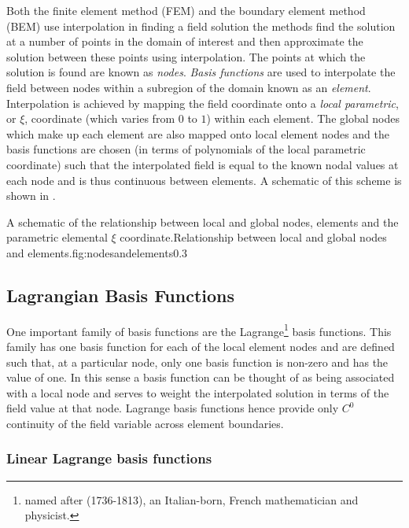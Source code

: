 Both the finite element method (FEM) and the boundary element method (BEM) use
interpolation in finding a field solution \ie the methods find the solution at
a number of points in the domain of interest and then approximate the solution
between these points using interpolation. The points at which the solution is
found are known as \emph{nodes}. \emph{Basis functions} are used to
interpolate the field between nodes within a subregion of the domain known as
an \emph{element}. Interpolation is achieved by mapping the field coordinate
onto a \emph{local parametric}, or $\xi$, coordinate (which varies from $0$ to
$1$) within each element. The global nodes which make up each element are also
mapped onto local element nodes and the basis functions are chosen (in terms
of polynomials of the local parametric coordinate) such that the interpolated
field is equal to the known nodal values at each node and is thus continuous
between elements. A schematic of this
scheme is shown in .

{A schematic of the relationship between local and global nodes, elements and the parametric elemental $\xi$
  coordinate.}{Relationship between local and global nodes and elements.}{fig:nodesandelements}{0.3}

\subsection{Lagrangian Basis Functions}
\label{sec:lagrangebasisfunctions}

One important family of basis functions are the Lagrange\footnote{named after
(1736-1813), an Italian-born, French mathematician and physicist.} basis functions. This
family has one basis function for each of the local element nodes and are
defined such that, at a particular node, only one basis function is non-zero
and has the value of one. In this sense a basis function can be thought of as
being associated with a local node and serves to weight the interpolated
solution in terms of the field value at that node. Lagrange basis functions
hence provide only $C^{0}$ continuity of the field variable across element
boundaries.

\subsubsection{Linear Lagrange basis functions}

